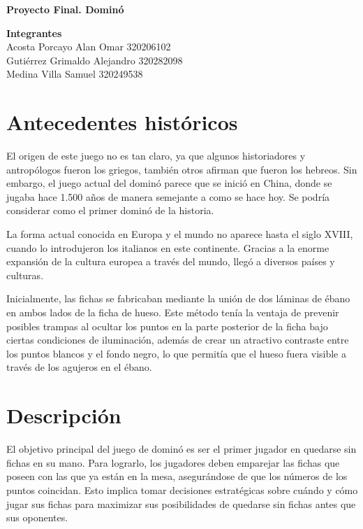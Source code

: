 \documentclass[12pt]{article}
\newcommand{\linejump}{\hfill \break}
\begin{document}
  \begin{center}
    \linejump
    \LARGE \textbf{Proyecto Final. Dominó}
  \end{center}

  \begin{flushright}
    \textbf{Integrantes} \\
    Acosta Porcayo Alan Omar 320206102 \\
    Gutiérrez Grimaldo Alejandro 320282098 \\ 
    Medina Villa Samuel 320249538 
  \end{flushright}

  \tableofcontents
  \newpage

  \section{Antecedentes históricos}
  El origen de este juego no es tan claro, ya que algunos historiadores y antropólogos fueron los griegos, también otros afirman que fueron los hebreos. Sin embargo, el juego actual del dominó parece que se inició en China, donde se jugaba hace 1.500 años de manera semejante a como se hace hoy. Se podría considerar como el primer dominó de la historia.
  
  La forma actual conocida en Europa y el mundo no aparece hasta el siglo XVIII, cuando lo introdujeron los italianos en este continente. Gracias a la enorme expansión de la cultura europea a través del mundo, llegó a diversos países y culturas.

  Inicialmente, las fichas se fabricaban mediante la unión de dos láminas de ébano en ambos lados de la ficha de hueso. Este método tenía la ventaja de prevenir posibles trampas al ocultar los puntos en la parte posterior de la ficha bajo ciertas condiciones de iluminación, además de crear un atractivo contraste entre los puntos blancos y el fondo negro, lo que permitía que el hueso fuera visible a través de los agujeros en el ébano.

  \section{Descripción}
  El objetivo principal del juego de dominó es ser el primer jugador en quedarse sin fichas en su mano. Para lograrlo, los jugadores deben emparejar las fichas que poseen con las que ya están en la mesa, asegurándose de que los números de los puntos coincidan. Esto implica tomar decisiones estratégicas sobre cuándo y cómo jugar sus fichas para maximizar sus posibilidades de quedarse sin fichas antes que sus oponentes. 
\end{document}
